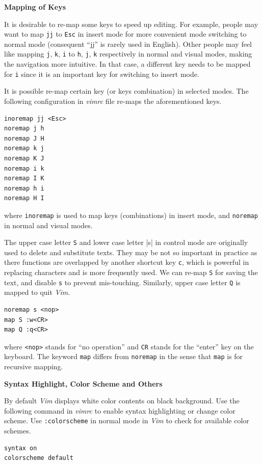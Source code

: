 \vspace{0.1in}
\noindent \textbf{Mapping of Keys}
\vspace{0.1in}

It is desirable to re-map some keys to speed up editing. For example, people may want to map \verb|jj| to \verb|Esc| in insert mode for more convenient mode switching to normal mode (consequent ``jj'' is rarely used in English). Other people may feel like mapping \verb|j|, \verb|k|, \verb|i| to \verb|h|, \verb|j|, \verb|k| respectively in normal and visual modes, making the navigation more intuitive. In that case, a different key needs to be mapped for \verb|i| since it is an important key for switching to insert mode.

It is possible re-map certain key (or keys combination) in selected modes. The following configuration in \textit{vimrc} file re-maps the aforementioned keys.
\begin{verbatim}
inoremap jj <Esc>
noremap j h
noremap J H
noremap k j
noremap K J
noremap i k
noremap I K
noremap h i
noremap H I
\end{verbatim}
where \verb|inoremap| is used to map keys (combinations) in insert mode, and \verb|noremap| in normal and visual modes.

The upper case letter \verb|S| and lower case letter |s| in control mode are originally used to delete and substitute texts. They may be not so important in practice as there functions are overlapped by another shortcut key \verb|c|, which is powerful in replacing characters and is more frequently used. We can re-map \verb|S| for saving the text, and disable \verb|s| to prevent mis-touching. Similarly, upper case letter \verb|Q| is mapped to quit \textit{Vim}.
\begin{verbatim}
noremap s <nop>
map S :w<CR>
map Q :q<CR>
\end{verbatim}
where \verb|<nop>| stands for ``no operation'' and \verb|CR| stands for the ``enter'' key on the keyboard. The keyword \verb|map| differs from \verb|noremap| in the sense that \verb|map| is for recursive mapping.

\vspace{0.1in}
\noindent \textbf{Syntax Highlight, Color Scheme and Others}
\vspace{0.1in}

By default \textit{Vim} displays white color contents on black background. Use the following command in \textit{vimrc} to enable syntax highlighting or change color scheme. Use \verb|:colorscheme| in normal mode in \textit{Vim} to check for available color schemes.
\begin{verbatim}
syntax on
colorscheme default
\end{verbatim}

